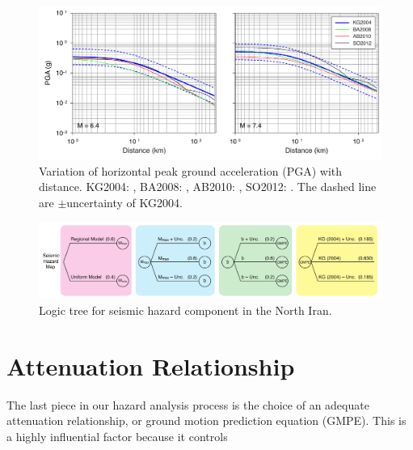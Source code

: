 \begin{figure}[t]
    \centering
    \includegraphics[width=\textwidth]{figures/pdf/figure-08} 
    \caption{Variation of horizontal peak ground acceleration (PGA) with distance. KG2004: \citet{Kalkan2004}, BA2008: \citet{Boore2008}, AB2010: \citet{Akkar2010}, SO2012: \citet{Soghrat2012}. The dashed line are $\pm$uncertainty of KG2004.}
    \label{fig:att}
\end{figure}

\begin{figure}[t]
    \centering
    \includegraphics[width=\textwidth]{figures/pdf/figure-09}
    \caption{Logic tree for seismic hazard component in the North Iran.}
    \label{fig:logic}
\end{figure}



\section{Attenuation Relationship}

The last piece in our hazard analysis process is the choice of an adequate attenuation relationship, or ground motion prediction equation (GMPE). This is a highly influential factor because it controls 

